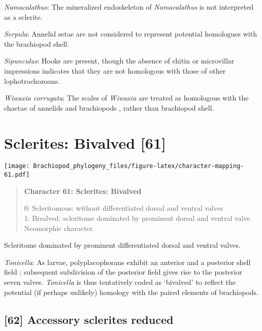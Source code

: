 \documentclass[openany]{book}
\theoremstyle{definition}
\theoremstyle{definition}
\theoremstyle{definition}
\theoremstyle{remark}
\begin{document}
\hypertarget{Namacalathus-coding-60}{}
\emph{Namacalathus}: The mineralized endoskeleton of \emph{Namacalathus}
is not interpreted as a sclerite.

\hypertarget{Serpula-coding-60}{}
\emph{Serpula}: Annelid setae are not considered to represent potential
homologues with the brachiopod shell.

\hypertarget{Sipunculus-coding-60}{}
\emph{Sipunculus}: Hooks are present, though the absence of chitin or
microvillar impressions indicates that they are not homologous with
those of other lophotrochozoans.

\hypertarget{Wiwaxia_corrugata-coding-60}{}
\emph{Wiwaxia corrugata}: The scales of \emph{Wiwaxia} are treated as
homologous with the chaetae of annelids and brachiopods
\citep{Butterfield1990, Smith2014, Zhang2015}, rather than brachiopod
shell.

\section{Sclerites: Bivalved {[}61{]}}\label{sclerites-bivalved-61}

\texttt{[image: Brachiopod\_phylogeny\_files/figure-latex/character-mapping-61.pdf]}

\begin{quote}
\textbf{Character 61: Sclerites: Bivalved}

0: Scleritomous: without differentiated dorsal and ventral valves\\
1: Bivalved: scleritome dominated by prominent dorsal and ventral
valve\\
Neomorphic character.
\end{quote}

Scleritome dominated by prominent differentiated dorsal and ventral
valves.

\hypertarget{Tonicella-coding-61}{}
\emph{Tonicella}: As larvae, polyplacophorans exhibit an anterior and a
posterior shell field \citep{Wanninger2002C}; subsequent subdivision of
the posterior field gives rise to the posterior seven valves.
\emph{Tonicella} is thus tentatively coded as `bivalved' to reflect the
potential (if perhaps unlikely) homology with the paired elements of
brachiopods.

\subsection*{{[}62{]} Accessory sclerites
reduced}\label{accessory-sclerites-reduced}
\end{document}
